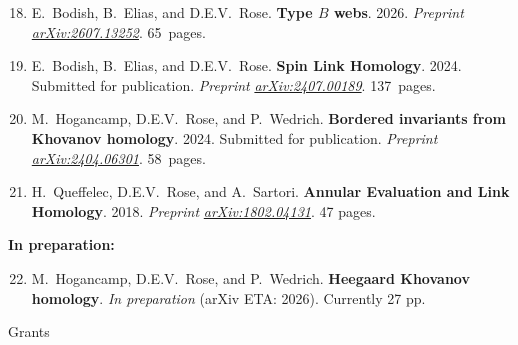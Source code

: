 \documentclass[10pt]{article}
\begin{document}
\begin{enumerate}
\setcounter{enumi}{17}

\item 
E.~Bodish, B.~Elias, and D.E.V.~Rose.
{\bf Type $B$ webs}.
2026.
\emph{Preprint}
\href{http://arxiv.org/abs/2607.13252}{\emph{arXiv:2607.13252}}.
65~pages.

\item
E.~Bodish, B.~Elias, and D.E.V.~Rose.
{\bf Spin Link Homology}.
2024.
Submitted for publication.
\emph{Preprint}
\href{http://arxiv.org/abs/2407.00189}{\emph{arXiv:2407.00189}}.
137~pages.

\item
M.~Hogancamp, D.E.V.~Rose, and P.~Wedrich.
{\bf Bordered invariants from Khovanov homology}.
2024.
Submitted for publication.
\emph{Preprint}
\href{http://arxiv.org/abs/2404.06301}{\emph{arXiv:2404.06301}}.
58~pages.

\item 
H.~Queffelec, D.E.V.~Rose, and A.~Sartori.
{\bf Annular Evaluation and Link Homology}.
2018.
\emph{Preprint}
\href{http://arxiv.org/abs/1802.04131}{\emph{arXiv:1802.04131}}.
47 pages.

\end{enumerate}

\noindent\textbf{In preparation:}
\begin{enumerate}
\setcounter{enumi}{21}
\item
M.~Hogancamp, D.E.V.~Rose, and P.~Wedrich.
{\bf Heegaard Khovanov homology}.
\emph{In preparation} (arXiv ETA: 2026).
Currently 27 pp.


\end{enumerate}


\bigskip
\noindent
{\large \sc Grants}
\end{document}
